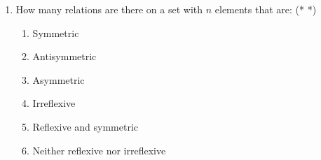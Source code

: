 \documentclass[a4paper]{article}
\begin{document}
\begin{enumerate}
\item How many relations are there on a set with $n$ elements that are: (* *)
\begin{enumerate}
\item Symmetric
\item Antisymmetric
\item Asymmetric
\item Irreflexive
\item Reflexive and symmetric
\item Neither reflexive nor irreflexive
\end{enumerate}




\end{enumerate}
\end{document}
